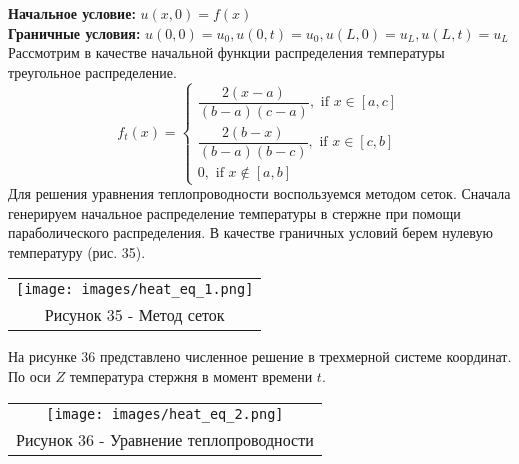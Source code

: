 \textbf{Начальное условие:} $u(x,0)=f(x)$\\
\textbf{Граничные условия:} $u(0,0)=u_0,u(0,t)=u_0,u(L,0)=u_L,u(L,t)=u_L$
Рассмотрим в качестве начальной функции распределения температуры треугольное распределение.
\begin{equation}
  f_t(x)=\begin{cases}
    \dfrac{2(x-a)}{(b-a)(c-a)}, \text{ if } x\in[a,c]\\
    \dfrac{2(b-x)}{(b-a)(b-c)}, \text{ if } x\in[c,b]\\
    0, \text{ if } x\notin[a,b]
  \end{cases}
\end{equation}
Для решения уравнения теплопроводности воспользуемся методом сеток. Сначала генерируем начальное распределение температуры в стержне при помощи параболического распределения. В качестве граничных условий берем нулевую температуру (рис. 35).
\begin{center}
  \begin{tabular}{c}
  \texttt{[image: images/heat\_eq\_1.png]}\\
  Рисунок 35 - Метод сеток
\end{tabular}
\end{center}
На рисунке 36 представлено численное решение в трехмерной системе координат. По оси $Z$ температура стержня в момент времени $t$.
\begin{center}
  \begin{tabular}{c}
  \texttt{[image: images/heat\_eq\_2.png]}\\
  Рисунок 36 - Уравнение теплопроводности
\end{tabular}
\end{center}
